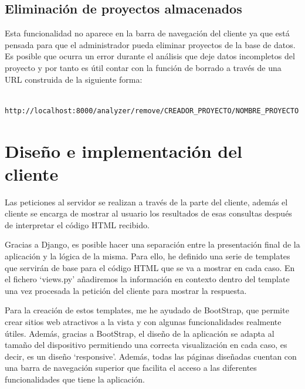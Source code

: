 \documentclass[a4paper, 12pt]{book}
\begin{document}
\subsection{Eliminación de proyectos almacenados}
\label{sec:seccion12.5}
Esta funcionalidad no aparece en la barra de navegación del cliente ya que está pensada para que el administrador pueda eliminar proyectos de la base de datos. Es posible que ocurra un error durante el análisis que deje datos incompletos del proyecto y por tanto es útil contar con la función de borrado a través de una URL construida de la siguiente forma:

{\footnotesize
\begin{verbatim}
    http://localhost:8000/analyzer/remove/CREADOR_PROYECTO/NOMBRE_PROYECTO
\end{verbatim}
}

\section{Diseño e implementación del cliente} 
\label{sec:seccion13}
Las peticiones al servidor se realizan a través de la parte del cliente, además el cliente se encarga de mostrar al usuario los resultados de esas consultas después de interpretar el código HTML recibido.

Gracias a Django, es posible hacer una separación entre la presentación final de la aplicación y la lógica de la misma. Para ello, he definido una serie de templates que servirán de base para el código HTML que se va a mostrar en cada caso. En el fichero `views.py' añadiremos la información en contexto dentro del template una vez procesada la petición del cliente para mostrar la respuesta.

Para la creación de estos templates, me he ayudado de BootStrap, que permite crear sitios web atractivos a la vista y con algunas funcionalidades realmente útiles. Además, gracias a BootStrap, el diseño de la aplicación se adapta al tamaño del dispositivo permitiendo una correcta visualización en cada caso, es decir, es un diseño `responsive'. Además, todas las páginas diseñadas cuentan con una barra de navegación superior que facilita el acceso a las diferentes funcionalidades que tiene la aplicación.
\end{document}
